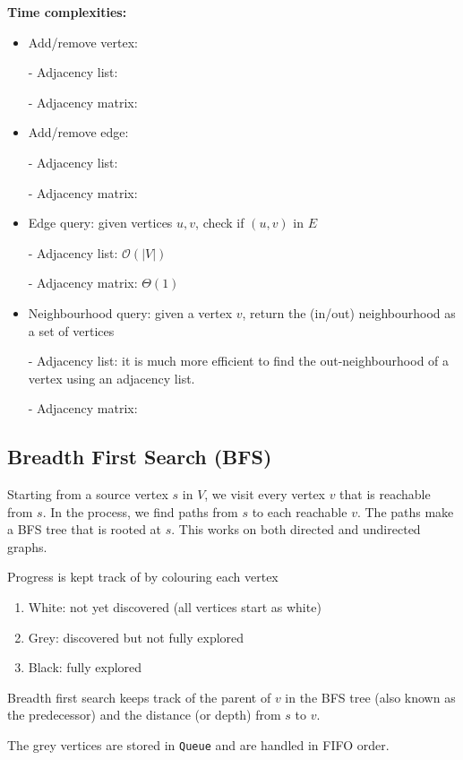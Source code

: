\documentclass[11pt]{article}
\begin{document}
\textbf{Time complexities:} 
\begin{itemize}
    \item Add/remove vertex: 
    
    - Adjacency list: 
    
    - Adjacency matrix: 
    
    \item Add/remove edge: 
    
    - Adjacency list: 
    
    - Adjacency matrix: 
    
    \item Edge query: given vertices $u,v$, check if $(u,v)$ in $E$
    
    - Adjacency list: $\mathcal{O}(|V|)$
    
    - Adjacency matrix: $\Theta(1)$
    
    \item Neighbourhood query: given a vertex $v$, return the (in/out) neighbourhood as a set of vertices 
    
    - Adjacency list: it is much more efficient to find the out-neighbourhood of a vertex using an adjacency list. 
    
    - Adjacency matrix:
\end{itemize}

\subsection{Breadth First Search (BFS)}
Starting from a source vertex $s$ in $V$, we visit every vertex $v$ that is reachable from $s$. In the process, we find paths from $s$ to each reachable $v$. The paths make a BFS tree that is rooted at $s$. This works on both directed and undirected graphs.

Progress is kept track of by colouring each vertex
\begin{enumerate}
    \item White: not yet discovered (all vertices start as white) 
    \item Grey: discovered but not fully explored 
    \item Black: fully explored 
\end{enumerate}

Breadth first search keeps track of the parent of $v$ in the BFS tree (also known as the predecessor) and the distance (or depth) from $s$ to $v$. 

The grey vertices are stored in \texttt{Queue} and are handled in FIFO order. 
\end{document}

